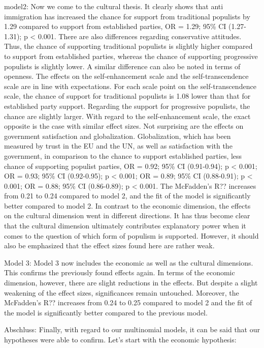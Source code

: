 \documentclass[]{article}
\begin{document}
model2: Now we come to the cultural thesis. It clearly shows that anti
immigration has increased the chance for support from traditional
populists by 1.29 compared to support from established parties, OR =
1.29; 95\% CI (1.27-1.31); p \textless{} 0.001. There are also
differences regarding conservative attitudes. Thus, the chance of
supporting traditional populists is slightly higher compared to support
from established parties, whereas the chance of supporting progressive
populists is slightly lower. A similar difference can also be noted in
terms of openness. The effects on the self-enhancement scale and the
self-transcendence scale are in line with expectations. For each scale
point on the self-transcendence scale, the chance of support for
traditional populists is 1.08 lower than that for established party
support. Regarding the support for progressive populists, the chance are
slightly larger. With regard to the self-enhancement scale, the exact
opposite is the case with similar effect sizes. Not surprising are the
effects on government satisfaction and globalization. Globalization,
which has been measured by trust in the EU and the UN, as well as
satisfaction with the government, in comparison to the chance to support
established parties, less chance of supporting populist parties, OR =
0.92; 95\% CI (0.91-0.94); p \textless{} 0.001; OR = 0.93; 95\% CI
(0.92-0.95); p \textless{} 0.001; OR = 0.89; 95\% CI (0.88-0.91); p
\textless{} 0.001; OR = 0.88; 95\% CI (0.86-0.89); p \textless{} 0.001.
The McFadden's R?? increases from 0.21 to 0.24 compared to model 2, and
the fit of the model is significantly better compared to model 2. In
contrast to the economic dimension, the effects on the cultural
dimension went in different directions. It has thus become clear that
the cultural dimension ultimately contributes explanatory power when it
comes to the question of which form of populism is supported. However,
it should also be emphasized that the effect sizes found here are rather
weak.

Model 3: Model 3 now includes the economic as well as the cultural
dimensions. This confirms the previously found effects again. In terms
of the economic dimension, however, there are slight reductions in the
effects. But despite a slight weakening of the effect sizes,
significances remain untouched. Moreover, the McFadden's R?? increases
from 0.24 to 0.25 compared to model 2 and the fit of the model is
significantly better compared to the previous model.

Abschluss: Finally, with regard to our multinomial models, it can be
said that our hypotheses were able to confirm. Let's start with the
economic hypothesis:
\end{document}
